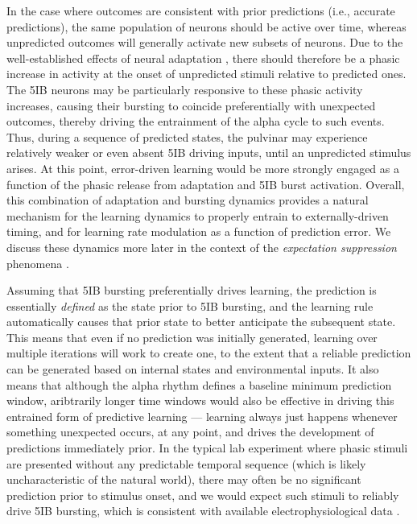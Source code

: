 \documentclass[11pt,twoside]{article}
\newif\myifpdf
\begin{document}
In the case where outcomes are consistent with prior predictions (i.e., accurate predictions), the same population of neurons should be active over time, whereas unpredicted outcomes will generally activate new subsets of neurons.  Due to the well-established effects of neural adaptation \cite{MullerMethaKrauskopfEtAl99,AbbottVarelaSenEtAl97,BretteGerstner05,Grill-SpectorHensonMartin06,Hennig13}, there should therefore be a phasic increase in activity at the onset of unpredicted stimuli relative to predicted ones.  The 5IB neurons may be particularly responsive to these phasic activity increases, causing their bursting to coincide preferentially with unexpected outcomes, thereby driving the entrainment of the alpha cycle to such events.  Thus, during a sequence of predicted states, the pulvinar may experience relatively weaker or even absent  5IB driving inputs, until an unpredicted stimulus arises.  At this point, error-driven learning would be more strongly engaged as a function of the phasic release from adaptation and 5IB burst activation.  Overall, this combination of adaptation and bursting dynamics provides a natural mechanism for the learning dynamics to properly entrain to externally-driven timing, and for learning rate modulation as a function of prediction error.  We discuss these dynamics more later in the context of the \emph{expectation suppression} phenomena \cite{SummerfieldTrittschuhMontiEtAl08,TodorovicEdeMarisEtAl11,MeyerOlson11,BastosUsreyAdamsEtAl12}.

Assuming that 5IB bursting preferentially drives learning, the prediction is essentially \emph{defined} as the state prior to 5IB bursting, and the learning rule automatically causes that prior state to better anticipate the subsequent state.  This means that even if no prediction was initially generated, learning over multiple iterations will work to create one, to the extent that a reliable prediction can be generated based on internal states and environmental inputs.  It also means that although the alpha rhythm defines a baseline minimum prediction window, aribtrarily longer time windows would also be effective in driving this entrained form of predictive learning --- learning always just happens whenever something unexpected occurs, at any point, and drives the development of predictions immediately prior.  In the typical lab experiment where phasic stimuli are presented without any predictable temporal sequence (which is likely uncharacteristic of the natural world), there may often be no significant prediction prior to stimulus onset, and we would expect such stimuli to reliably drive 5IB bursting, which is consistent with available electrophysiological data \cite{Bender82,PetersenRobinsonKeys85,BenderYouakim01,Robinson93,SaalmannPinskWangEtAl12,KomuraNikkuniHirashimaEtAl13,ZhouSchaferDesimone16}.
\end{document}
